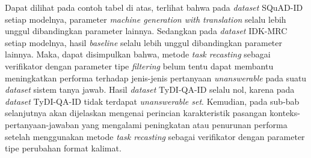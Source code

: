 Dapat dilihat pada contoh tabel di atas, terlihat bahwa pada \emph{dataset} SQuAD-ID setiap modelnya, parameter \emph{machine generation with translation} selalu lebih unggul dibandingkan parameter lainnya. Sedangkan pada \emph{dataset} IDK-MRC setiap modelnya, hasil \emph{baseline} selalu lebih unggul dibandingkan parameter lainnya. Maka, dapat disimpulkan bahwa, metode \emph{task recasting} sebagai verifikator dengan parameter tipe \emph{filtering} belum tentu dapat membantu meningkatkan performa terhadap jenis-jenis pertanyaan \emph{unanswerable} pada suatu \emph{dataset} sistem tanya jawab. Hasil \emph{dataset} TyDI-QA-ID selalu nol, karena pada \emph{dataset} TyDI-QA-ID tidak terdapat \emph{unanswerable set}. Kemudian, pada sub-bab selanjutnya akan dijelaskan mengenai perincian karakteristik pasangan konteks-pertanyaan-jawaban yang mengalami peningkatan atau penurunan performa setelah menggunakan metode \emph{task recasting} sebagai verifikator dengan parameter tipe perubahan format kalimat.

